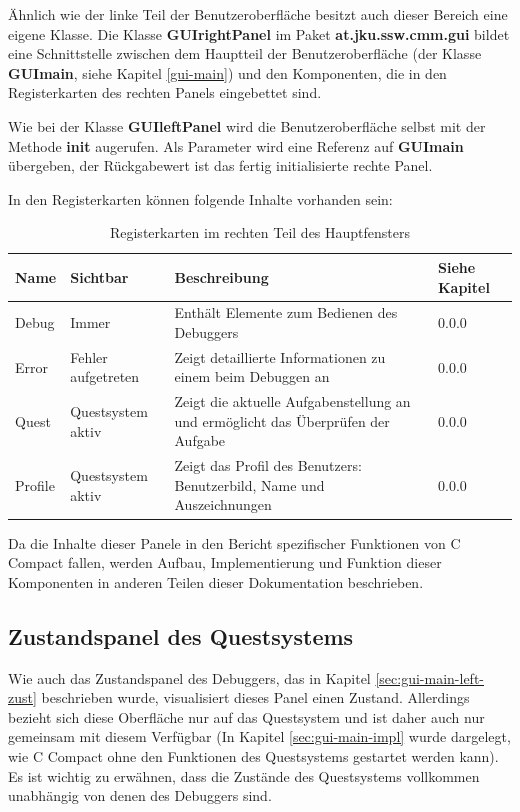 Ähnlich wie der linke Teil der Benutzeroberfläche besitzt auch dieser Bereich eine eigene Klasse. Die Klasse \textbf{GUIrightPanel} im Paket \textbf{at.jku.ssw.cmm.gui} bildet eine Schnittstelle zwischen dem Hauptteil der Benutzeroberfläche (der Klasse \textbf{GUImain}, siehe Kapitel \ref{gui-main}) und den Komponenten, die in den Registerkarten des rechten Panels eingebettet sind.

Wie bei der Klasse \textbf{GUIleftPanel} wird die Benutzeroberfläche selbst mit der Methode \textbf{init} augerufen. Als Parameter wird eine Referenz auf \textbf{GUImain} übergeben, der Rückgabewert ist das fertig initialisierte rechte Panel.

In den Registerkarten können folgende Inhalte vorhanden sein:
\def\arraystretch{1.6}
\begin{table}
\begin{tabularx}{\columnwidth}{l|p{3cm}|p{6cm}|l}
\textbf{Name}&\textbf{Sichtbar}&\textbf{Beschreibung}&\textbf{Siehe Kapitel}\\
\hline
Debug&Immer&Enthält Elemente zum Bedienen des Debuggers&0.0.0\\%
Error&Fehler aufgetreten&Zeigt detaillierte Informationen zu einem beim Debuggen an&0.0.0\\%
Quest&Questsystem aktiv&Zeigt die aktuelle Aufgabenstellung an und ermöglicht das Überprüfen der Aufgabe&0.0.0\\%
Profile&Questsystem aktiv&Zeigt das Profil des Benutzers: Benutzerbild, Name und Auszeichnungen&0.0.0%
\end{tabularx}
\caption{Registerkarten im rechten Teil des Hauptfensters}\label{tab:gui-main-right-reg}
\end{table}

Da die Inhalte dieser Panele in den Bericht spezifischer Funktionen von C Compact fallen, werden Aufbau, Implementierung und Funktion dieser Komponenten in anderen Teilen dieser Dokumentation beschrieben.

\subsection{Zustandspanel des Questsystems}
Wie auch das Zustandspanel des Debuggers, das in Kapitel \ref{sec:gui-main-left-zust} beschrieben wurde, visualisiert dieses Panel einen Zustand. Allerdings bezieht sich diese Oberfläche nur auf das Questsystem und ist daher auch nur gemeinsam mit diesem Verfügbar (In Kapitel \ref{sec:gui-main-impl} wurde dargelegt, wie C Compact ohne den Funktionen des Questsystems gestartet werden kann). Es ist wichtig zu erwähnen, dass die Zustände des Questsystems vollkommen unabhängig von denen des Debuggers sind.

